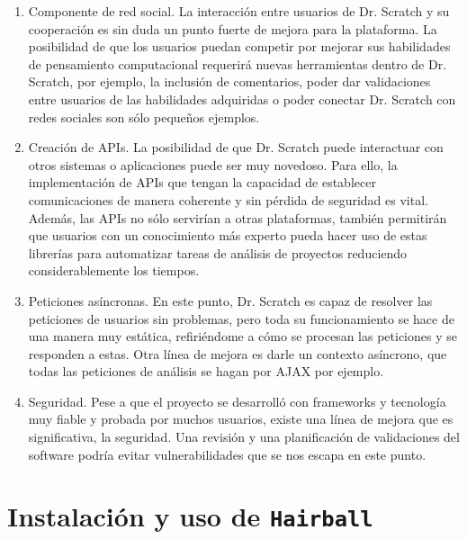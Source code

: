 \documentclass[a4paper, 12pt]{book}
\begin{document}
\begin{enumerate}
  \item Componente de red social. La interacción entre usuarios de Dr. Scratch y su
	cooperación es sin duda un punto fuerte de mejora para la plataforma. La posibilidad
	de que los usuarios puedan competir por mejorar sus habilidades de pensamiento
	computacional requerirá nuevas herramientas dentro de Dr. Scratch, por ejemplo, la
	inclusión de comentarios, poder dar validaciones entre usuarios de las habilidades
	adquiridas o poder conectar Dr. Scratch con redes sociales son sólo pequeños ejemplos.
  \item Creación de APIs. La posibilidad de que Dr. Scratch puede interactuar con
	otros sistemas o aplicaciones puede ser muy novedoso. Para ello, la implementación
	de APIs que tengan la capacidad de establecer comunicaciones de manera coherente y
	sin pérdida de seguridad es vital. Además, las APIs no sólo servirían a otras
	plataformas, también permitirán que usuarios con un conocimiento más experto pueda
	hacer uso de estas librerías para automatizar tareas de análisis de proyectos 
	reduciendo considerablemente los tiempos.
	\item Peticiones asíncronas. En este punto, Dr. Scratch es capaz de resolver las
	peticiones de usuarios sin problemas, pero toda su funcionamiento se hace de una
	manera muy estática, refiriéndome a cómo se procesan las peticiones y se responden
	a estas. Otra línea de mejora es darle un contexto asíncrono, que todas las 
	peticiones de análisis se hagan por AJAX por ejemplo.
	\item Seguridad. Pese a que el proyecto se desarrolló con frameworks y tecnología 
	muy fiable y probada por muchos usuarios, existe una línea de mejora que es 
	significativa, la seguridad. Una revisión y una planificación de validaciones del
	software podría evitar vulnerabilidades que se nos escapa en este punto. 
\end{enumerate}








\cleardoublepage
\appendix
\chapter{Instalación y uso de \texttt{Hairball}}
\label{app:manual}





\cleardoublepage
\end{document}
